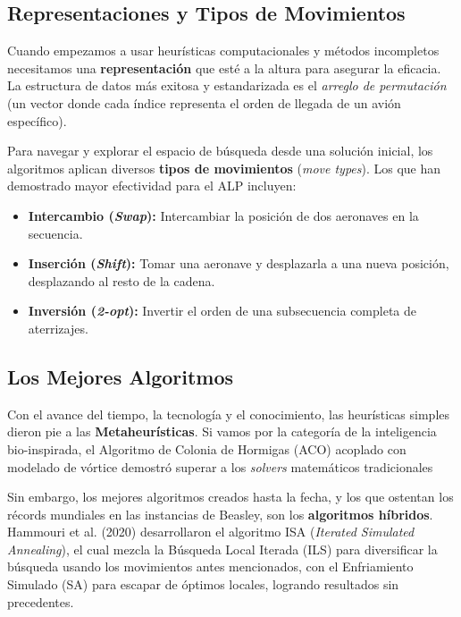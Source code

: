 \documentclass[letter, 10pt]{article}
\begin{document}
\subsection{Representaciones y Tipos de Movimientos}

Cuando empezamos a usar heur\'isticas computacionales y m\'etodos incompletos necesitamos una \textbf{representaci\'on} que est\'e a la altura para asegurar la eficacia.
La estructura de datos m\'as exitosa y estandarizada es el \textit{arreglo de permutaci\'on} (un vector donde cada \'indice representa el orden de llegada de un avi\'on espec\'ifico).

Para navegar y explorar el espacio de b\'usqueda desde una soluci\'on inicial, los algoritmos aplican diversos 
\textbf{tipos de movimientos} (\textit{move types}). 
Los que han demostrado mayor efectividad para el ALP incluyen:
\begin{itemize}
    \item \textbf{Intercambio (\textit{Swap}):} Intercambiar la posici\'on de dos aeronaves en la secuencia.
    \item \textbf{Inserci\'on (\textit{Shift}):} Tomar una aeronave y desplazarla a una nueva posici\'on, desplazando al resto de la cadena.
    \item \textbf{Inversi\'on (\textit{2-opt}):} Invertir el orden de una subsecuencia completa de aterrizajes.
\end{itemize}

\subsection{Los Mejores Algoritmos}
Con el avance del tiempo, la tecnolog\'ia y el conocimiento, las heur\'isticas simples dieron pie a las \textbf{Metaheur\'isticas}. Si vamos por la categor\'ia de la inteligencia bio-inspirada, el Algoritmo de Colonia de Hormigas (ACO) acoplado con modelado de v\'ortice demostr\'o superar a los \textit{solvers} matem\'aticos tradicionales \cite{xu2017}

Sin embargo, los mejores algoritmos creados hasta la fecha, y los que ostentan los r\'ecords mundiales en las instancias de Beasley, son los \textbf{algoritmos h\'ibridos}. Hammouri et al. (2020) \cite{hammouri2020} desarrollaron el algoritmo ISA (\textit{Iterated Simulated Annealing}), el cual mezcla la B\'usqueda Local Iterada (ILS) para diversificar la b\'usqueda usando los movimientos antes mencionados, con el Enfriamiento Simulado (SA) para escapar de \'optimos locales, logrando resultados sin precedentes.
\end{document}
